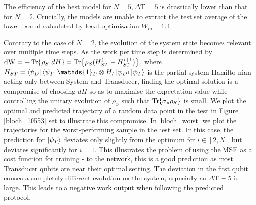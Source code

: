 The efficiency of the best model for $N=5, \Delta \mathrm{T} = 5$ is drastically lower than that for $N=2$.
Crucially, the models are unable to extract the test set average of the lower bound calculated by local optimisation $W_{lo} = 1.4$.

Contrary to the case of $N=2$, the evolution of the system state becomes relevant over multiple time steps.
As the work per time step is determined by $\mathrm{dW} = -\Tr{\rho_S \ dH} = \Tr{\rho_S (H_{ST}^i - H_{ST}^{i+1})}$, where $H_{ST} = \bra{\psi_D}\bra{\psi_T} \mathds{1}_D \otimes H_I \ket{\psi_D} \ket{\psi_T}$ is the partial system Hamilto-nian acting only between System and Transducer, finding the optimal solution is a compromise of choosing $dH$ so as to maximise the expectation value while controlling the unitary evolution of $\rho_S$ such that $\Tr{\sigma_z \rho_S}$ is small.
We plot the optimal and predicted trajectory of a random data point in the test in Figure \ref{bloch_10553} set to illustrate this compromise.
In \ref{bloch_worst} we plot the trajectories for the worst-performing sample in the test set.
In this case, the prediction for $\ket{\psi_T}$ deviates only slightly from the optimum for $i \in [2, N]$ but deviates significantly for $i=1$.
This illustrates the problem of using the MSE as a cost function for training - to the network, this is a good prediction as most Transducer qubits are near their optimal setting.
The deviation in the first qubit causes a completely different evolution on the system, especially as $\Delta \mathrm{T} = 5$ is large.
This leads to a negative work output when following the predicted protocol.



